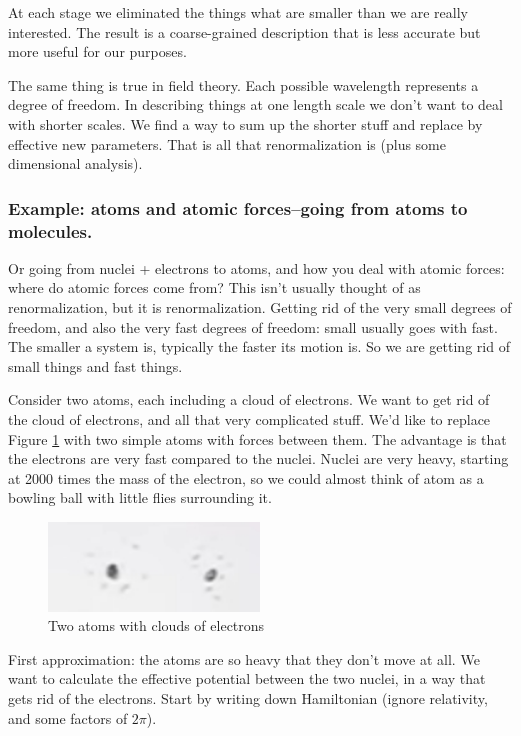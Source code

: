 \documentclass[]{article}
\begin{document}
At each stage we eliminated the things what are smaller than we are really interested. The result is a coarse-grained description that is less accurate but more useful for our purposes.

The same thing is true in field theory. Each possible wavelength represents a degree of freedom. In describing things at one length scale we don't want to deal with shorter scales. We find a way to sum up the shorter stuff and replace by effective new parameters. That is all that renormalization is (plus some dimensional analysis).

\subsubsection{Example: atoms and atomic forces--going from atoms to molecules.}

Or going from nuclei + electrons to atoms, and how you deal with atomic forces: where do atomic forces come from? This isn't usually thought of as renormalization, but it is renormalization. Getting rid of the very small degrees of freedom, and also the very fast degrees of freedom: small usually goes with fast. The smaller a system is, typically the faster its motion is. So we are getting rid of small things and fast things.

Consider two atoms, each including a cloud of electrons. We want to get rid of the cloud of electrons, and all that very complicated stuff. We'd like to replace Figure \ref{fig:3-2-atoms} with two simple atoms with forces between them. The advantage is that the electrons are very fast compared to the nuclei. Nuclei are very heavy, starting at 2000 times the mass of the electron, so we could almost think of atom as a bowling ball with little flies surrounding it.

\begin{figure}[H]
	\begin{center}
		\caption{Two atoms with clouds of electrons}\label{fig:3-2-atoms}
		\includegraphics[width=0.5\textwidth]{3-2-atoms}
	\end{center}
\end{figure}

First approximation: the atoms are so heavy that they don't move at all. We want to calculate the effective potential between the two nuclei, in a way that gets rid of the electrons. Start by writing down Hamiltonian (ignore relativity, and some factors of $2\pi$).
\end{document}
